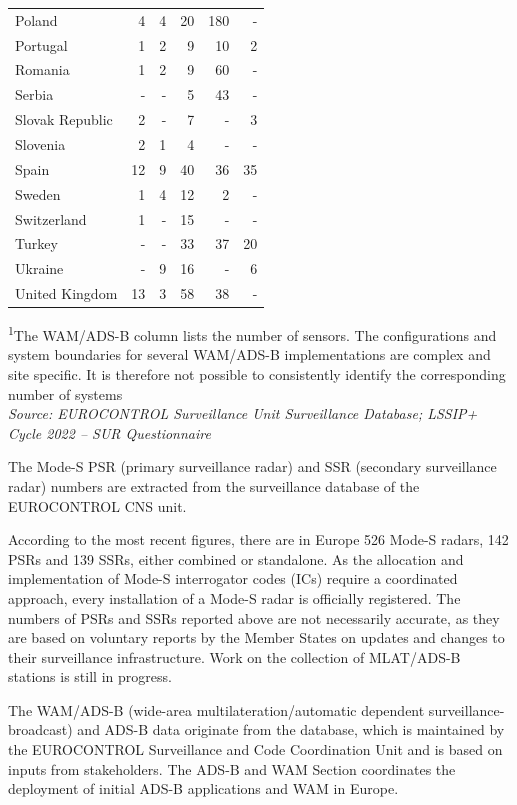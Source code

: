 \documentclass[
  11pt,
  a4paper,
]{book}
\begin{document}
\begin{longtable}{lrrrrr}
Poland & 4 & 4 & 20 & 180 & - \\ 
Portugal & 1 & 2 & 9 & 10 & 2 \\ 
Romania & 1 & 2 & 9 & 60 & - \\ 
Serbia & - & - & 5 & 43 & - \\ 
Slovak Republic & 2 & - & 7 & - & 3 \\ 
Slovenia & 2 & 1 & 4 & - & - \\ 
Spain & 12 & 9 & 40 & 36 & 35 \\ 
Sweden & 1 & 4 & 12 & 2 & - \\ 
Switzerland & 1 & - & 15 & - & - \\ 
Turkey & - & - & 33 & 37 & 20 \\ 
Ukraine & - & 9 & 16 & - & 6 \\ 
United Kingdom & 13 & 3 & 58 & 38 & - \\ 
\bottomrule
\end{longtable}
\begin{minipage}{\linewidth}
\textsuperscript{1}The WAM/ADS-B column lists the number of sensors. The configurations and system boundaries for several WAM/ADS-B implementations are complex and site specific. It is therefore not possible to consistently identify the corresponding number of systems\\
\emph{Source: EUROCONTROL Surveillance Unit Surveillance Database; LSSIP+ Cycle 2022 -- SUR Questionnaire}\\
\end{minipage}

The Mode-S PSR (primary surveillance radar) and SSR (secondary
surveillance radar) numbers are extracted from the surveillance database
of the EUROCONTROL CNS unit.

According to the most recent figures, there are in Europe 526 Mode-S
radars, 142 PSRs and 139 SSRs, either combined or standalone. As the
allocation and implementation of Mode-S interrogator codes (ICs) require
a coordinated approach, every installation of a Mode-S radar is
officially registered. The numbers of PSRs and SSRs reported above are
not necessarily accurate, as they are based on voluntary reports by the
Member States on updates and changes to their surveillance
infrastructure. Work on the collection of MLAT/ADS-B stations is still
in progress.

The WAM/ADS-B (wide-area multilateration/automatic dependent
surveillance-broadcast) and ADS-B data originate from the database,
which is maintained by the EUROCONTROL Surveillance and Code
Coordination Unit and is based on inputs from stakeholders. The ADS-B
and WAM Section coordinates the deployment of initial ADS-B applications
and WAM in Europe.
\end{document}

